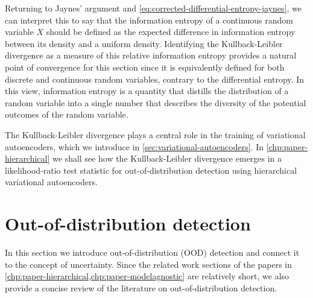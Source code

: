 Returning to Jaynes' argument and \cref{eq:corrected-differential-entropy-jaynes}, we can interpret this to say that the information entropy of a continuous random variable $X$ should be defined as the expected difference in information entropy between its density and a uniform density. 
Identifying the Kullback-Leibler divergence as a measure of this relative information entropy provides a natural point of convergence for this section since it is equivalently defined for both discrete and continuous random variables, contrary to the differential entropy. 
In this view, information entropy is a quantity that distills the distribution of a random variable into a single number that describes the diversity of the potential outcomes of the random variable.

The Kullback-Leibler divergence plays a central role in the training of variational autoencoders, which we introduce in \cref{sec:variational-autoencoders}. In \cref{chp:paper-hierarchical} we shall see how the Kullback-Leibler divergence emerges in a likelihood-ratio test statistic for out-of-distribution detection using hierarchical variational autoencoders. 



\section{Out-of-distribution detection} \label{sec:out-of-distribution-detection}
% 
%
%
In this section we introduce out-of-distribution (OOD) detection and connect it to the concept of uncertainty. 
Since the related work sections of the papers in \cref{chp:paper-hierarchical,chp:paper-modelagnostic} are relatively short, we also provide a concise review of the literature on out-of-distribution detection. 



